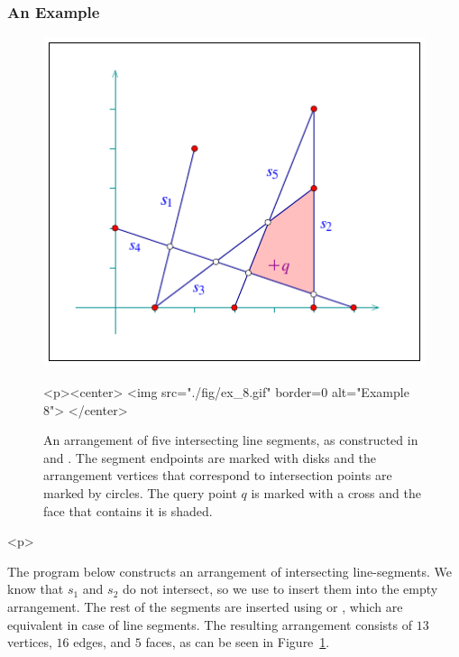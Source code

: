 \subsubsection{An Example}
\label{arr_sssec:insert_ex}
%
\begin{figure}[!htp]
\begin{ccTexOnly}
  \begin{center}
  \includegraphics{Arrangement_2/fig/ex_8}
  \end{center}
\end{ccTexOnly}
\begin{ccHtmlOnly}
  <p><center>
  <img src="./fig/ex_8.gif" border=0 alt="Example 8">
  </center>
\end{ccHtmlOnly}
\caption{An arrangement of five intersecting line segments, as
constructed in  and . The segment
endpoints are marked with disks and the arrangement vertices
that correspond to intersection points are marked by circles.
The query point $q$ is marked with a cross and the face that
contains it is shaded.}
\label{arr_fig:ex_8}
\end{figure}

\begin{ccHtmlOnly}<p>\end{ccHtmlOnly}
The program below constructs an arrangement of intersecting
line-segments. We know that $s_1$ and $s_2$ do not intersect, so
we use  to insert them into the
empty arrangement. The rest of the segments are inserted using
 or , which are
equivalent in case of line segments. The resulting arrangement consists
of $13$ vertices, $16$ edges, and $5$ faces, as can be seen in
Figure~\ref{arr_fig:ex_8}.

